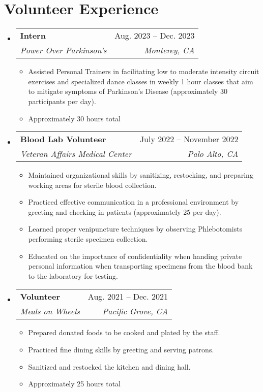 \documentclass[letterpaper,11pt]{article}
\makeatletter
\newcommand{\resumeItem}[1]{
  \item\small{
    {#1 \vspace{-2pt}}
  }
}
\newcommand{\resumeSubheading}[4]{
  \vspace{-2pt}\item
    \begin{tabular*}{0.97\textwidth}[t]{l@{\extracolsep{\fill}}r}
      \textbf{#1} & #2 \\
      \textit{\small#3} & \textit{\small #4} \\
    \end{tabular*}\vspace{-7pt}
}
\newcommand{\resumeSubHeadingListStart}{\begin{itemize}[leftmargin=0.15in, label={}]}
\newcommand{\resumeSubHeadingListEnd}{\end{itemize}}
\newcommand{\resumeItemListStart}{\begin{itemize}}
\newcommand{\resumeItemListEnd}{\end{itemize}\vspace{-5pt}}
\makeatother
\begin{document}
\section{Volunteer Experience}
  \resumeSubHeadingListStart
    \resumeSubheading
      {Intern}{Aug. 2023 -- Dec. 2023}
      {Power Over Parkinson's}{Monterey, CA}
      \resumeItemListStart
        \resumeItem{Assisted Personal Trainers in facilitating low to moderate intensity circuit exercises and specialized dance classes in weekly 1 hour classes that aim to mitigate symptoms of Parkinson's Disease (approximately 30 participants per day).}
        \resumeItem{Approximately 30 hours total}
      \resumeItemListEnd
    \resumeSubheading
      {Blood Lab Volunteer}{July 2022 -- November 2022}
      {Veteran Affairs Medical Center}{Palo Alto, CA}
      \resumeItemListStart
        \resumeItem{Maintained organizational skills by sanitizing, restocking, and preparing working areas for sterile blood collection.}
        \resumeItem{Practiced effective communication in a professional environment by greeting and checking in patients (approximately 25 per day).}
        \resumeItem{Learned proper venipuncture techniques by observing Phlebotomists performing sterile specimen collection.}
        \resumeItem{Educated on the importance of confidentiality when handing private personal information when transporting specimens from the blood bank to the laboratory for testing.}
    \resumeItemListEnd
    \resumeSubheading
      {Volunteer}{Aug. 2021 -- Dec. 2021}
      {Meals on Wheels}{Pacific Grove, CA}
      \resumeItemListStart
        \resumeItem{Prepared donated foods to be cooked and plated by the staff.}
        \resumeItem{Practiced fine dining skills by greeting and serving patrons.}
        \resumeItem{Sanitized and restocked the kitchen and dining hall.}
        \resumeItem{Approximately 25 hours total}
      \resumeItemListEnd
  \resumeSubHeadingListEnd
\end{document}
